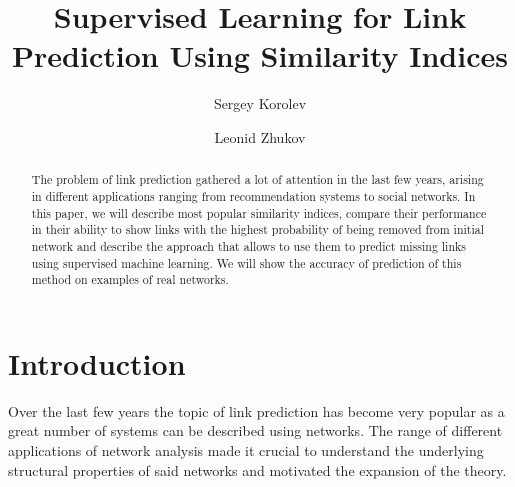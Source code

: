 \documentclass{llncs}
\begin{document}
%
\title{Supervised Learning for Link Prediction Using Similarity Indices}
%
%
\author{Sergey Korolev \and Leonid Zhukov}
%
%
%

\maketitle              %

\begin{abstract}
The problem of link prediction gathered a lot of attention in the last few years,
arising in different applications ranging from recommendation systems to social networks.
In this paper, we will describe most popular similarity indices, compare their
performance in their ability to show links with the highest probability
of being removed from initial network and describe the approach
that allows to use them to predict missing links using supervised machine learning. 
We will show the accuracy of prediction of this method on examples of real networks.
\end{abstract}
%
\section{Introduction}
%
Over the last few years the topic of link prediction has become very popular as a great number of systems can be described using networks. The range of different applications of network analysis made it crucial to understand the underlying structural properties of said networks and motivated the expansion of the theory.
\end{document}
